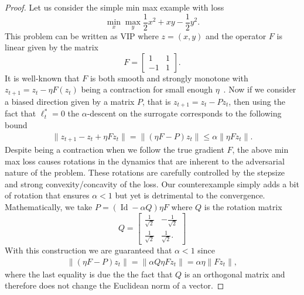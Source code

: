 \documentclass{article} %
\theoremstyle{definition}
\newcommand{\id}{\operatorname{Id}}
\begin{document}
\begin{proof}
    

Let us consider the simple min max example with loss
\[
    \min_x \max_y \frac{1}{2}x^2 + xy -\frac{1}{2}y^2.
\]
This problem can be written as VIP where $z = (x,y)$ and the operator $F$ is linear given by the matrix 
\[
F = \begin{bmatrix}
    1 & 1 \\
    -1 & 1
\end{bmatrix}.
\]
It is well-known that $F$ is both smooth and strongly monotone with $z_{t+1} = z_t -\eta F(z_t)$ being a contraction for small enough $\eta$~\citep{facchinei2003finite}.
Now if we consider a biased direction given by a matrix $P$, that is $z_{t+1} = z_t -P z_t$, then using the fact that $\ell_t^\ast =0$ the $\alpha$-descent on the surrogate corresponds to the following bound
\begin{align*}
    \|z_{t+1}-z_t + \eta F z_t\| = \|(\eta F -P) z_t\| \leq \alpha \|\eta F z_t\|.
\end{align*}
Despite being a contraction when we follow the true gradient $F$, the above min max loss causes rotations in the dynamics that are inherent to the adversarial nature of the problem. These rotations are carefully controlled by the stepsize and strong convexity/concavity of the loss.
Our counterexample simply adds a bit of rotation that ensures $\alpha <1 $ but yet is detrimental to the convergence.
Mathematically, we take $P = (\id -\alpha Q) \eta F$ where $Q$ is the rotation matrix
\[
Q = 
\begin{bmatrix}
    \frac{1}{\sqrt{2}}  & -\frac{1}{\sqrt{2}} \\
    \frac{1}{\sqrt{2}}  & \frac{1}{\sqrt{2}}. 
\end{bmatrix}
\]
With this construction we are guaranteed that $\alpha < 1$ since
\begin{align*}
    \|(\eta F -P) z_t\| = \|\alpha Q \eta F z_t\| =  \alpha\eta \|F z_t\|,
\end{align*}
where the last equality is due the the fact that $Q$ is an orthogonal matrix and therefore does not change the Euclidean norm of a vector.


\end{proof}
\end{document}
